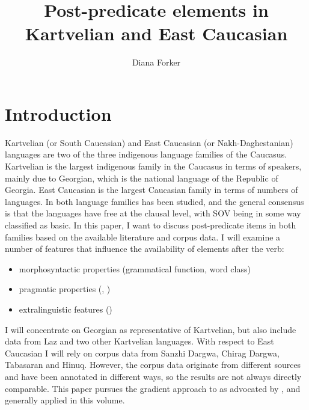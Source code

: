 \documentclass[output=paper,colorlinks,citecolor=brown,draftmode]{langscibook}
\author{Diana Forker\orcid{0000-0003-4247-9163}\affiliation{Friedrich Schiller University Jena}}
\title{Post-predicate elements in Kartvelian and East Caucasian}
\begin{document}
\maketitle\label{WOWA:ch:10}

\section{Introduction}\label{EC:ss:1}

Kartvelian (or South Caucasian) and East Caucasian (or Nakh-Daghestanian) languages are two of the three indigenous language families of the Caucasus. Kartvelian is the largest indigenous family in the Caucasus in terms of speakers, mainly due to Georgian, which is the national language of the Republic of Georgia. East Caucasian is the largest Caucasian family in terms of numbers of languages. In both language families  has been studied, and the general consensus is that the languages have free  at the clausal level, with SOV being in some way classified as basic. In this paper, I want to discuss post-predicate items in both families based on the available literature and corpus data. I will examine a number of features that influence the availability of elements after the verb:

\begin{itemize}
\item morphosyntactic properties (grammatical function, word class)
\item pragmatic properties (, )
\item extralinguistic features ()
 
\end{itemize}

I will concentrate on Georgian as representative of Kartvelian, but also include data from Laz and two other Kartvelian languages. With respect to East Caucasian I will rely on corpus data from Sanzhi Dargwa, Chirag Dargwa, Tabasaran and Hinuq. However, the corpus data originate from different sources and have been annotated in different ways, so the results are not always directly comparable. This paper pursues the gradient approach to  as advocated by \citet{levshina_why_2023}, and generally applied in this volume. 
\end{document}
